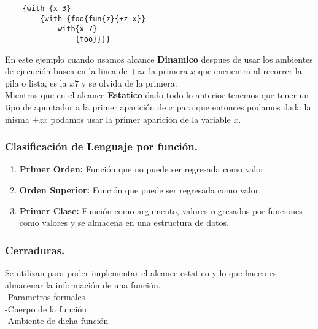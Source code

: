 \documentclass[12pt]{article}
\begin{document}
\begin{lstlisting}
    {with {x 3}
        {with {foo{fun{z}{+z x}}
            with{x 7}
                {foo}}}}
\end{lstlisting}
En este ejemplo cuando usamos alcance \textbf{Dinamico} despues de usar los ambientes de ejecución busca en la linea de $+ z x$
la primera $x$ que encuentra al recorrer la pila o lista, es la $x 7$ y se olvida de la primera.\\
Mientras que en el alcance \textbf{Estatico} dado todo lo anterior tenemos que tener un tipo de apuntador a la primer aparición de $x$
para que entonces podamos dada la misma $+ z x$ podamos usar la primer aparición de la variable $x$.

{\color{blue} \subsubsection*{Clasificación de Lenguaje por función.}}
\vspace{-0.5em}
\begin{enumerate}
    \item \textbf{Primer Orden:} Función que no puede ser regresada como valor.
    \item \textbf{Orden Superior:} Función que puede ser regresada como valor.
    \item \textbf{Primer Clase:} Función como argumento, valores regresados por funciones como valores y se almacena en una estructura de datos.
\end{enumerate}

{\color{blue} \subsubsection*{Cerraduras.}}
\vspace{-0.5em}
Se utilizan para poder implementar el alcance estatico y lo que hacen es almacenar la información de una función.\\
-Parametros formales\\
-Cuerpo de la función\\
-Ambiente de dicha función\\
\end{document}
